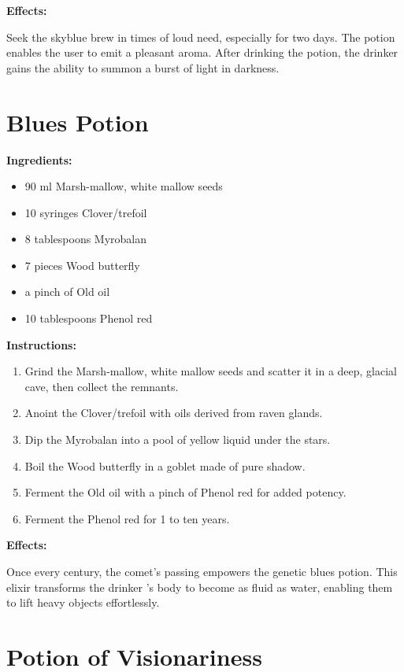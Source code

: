 \documentclass{article}
\begin{document}
\textbf{Effects:}

Seek the skyblue brew in times of loud need, especially for two days. The potion enables the user to emit a pleasant aroma. After drinking the potion, the drinker gains the ability to summon a burst of light in darkness.

\newpage
\section*{Blues Potion}

\textbf{Ingredients:}

\begin{itemize}
  \item 90 ml Marsh-mallow, white mallow seeds
  \item 10 syringes Clover/trefoil
  \item 8 tablespoons Myrobalan
  \item 7 pieces Wood butterfly
  \item a pinch of Old oil
  \item 10 tablespoons Phenol red
\end{itemize}

\textbf{Instructions:}

\begin{enumerate}
  \item Grind the Marsh-mallow, white mallow seeds and scatter it in a deep, glacial cave, then collect the remnants.
  \item Anoint the Clover/trefoil with oils derived from raven glands.
  \item Dip the Myrobalan into a pool of yellow liquid under the stars.
  \item Boil the Wood butterfly in a goblet made of pure shadow.
  \item Ferment the Old oil with a pinch of Phenol red for added potency.
  \item Ferment the Phenol red for 1 to ten years.
\end{enumerate}

\textbf{Effects:}

Once every century, the comet’s passing empowers the genetic blues potion. This elixir transforms the drinker 's body to become as fluid as water, enabling them to lift heavy objects effortlessly.

\newpage
\section*{Potion of Visionariness}
\end{document}
